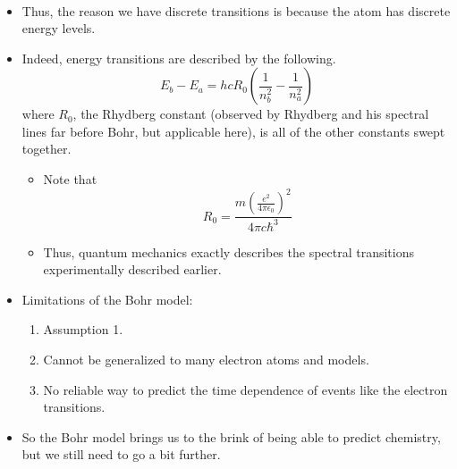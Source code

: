 \documentclass[../notes.tex]{subfiles}
\begin{document}
\begin{itemize}
\begin{align*}
    \end{align*}
    \item Thus, the reason we have discrete transitions is because the atom has discrete energy levels.
    \item Indeed, energy transitions are described by the following.
    \begin{equation*}
        E_b-E_a = hcR_0\left( \frac{1}{n_b^2}-\frac{1}{n_a^2} \right)
    \end{equation*}
    where $R_0$, the Rhydberg constant (observed by Rhydberg and his spectral lines far before Bohr, but applicable here), is all of the other constants swept together.
    \begin{itemize}
        \item Note that
        \begin{equation*}
            R_0 = \frac{m\left( \frac{e^2}{4\pi\epsilon_0} \right)^2}{4\pi c\hbar^3}
        \end{equation*}
        \item Thus, quantum mechanics exactly describes the spectral transitions experimentally described earlier.
    \end{itemize}
    \item Limitations of the Bohr model:
    \begin{enumerate}
        \item Assumption 1.
        \item Cannot be generalized to many electron atoms and models.
        \item No reliable way to predict the time dependence of events like the electron transitions.
    \end{enumerate}
    \item So the Bohr model brings us to the brink of being able to predict chemistry, but we still need to go a bit further.
\end{itemize}
\end{document}
